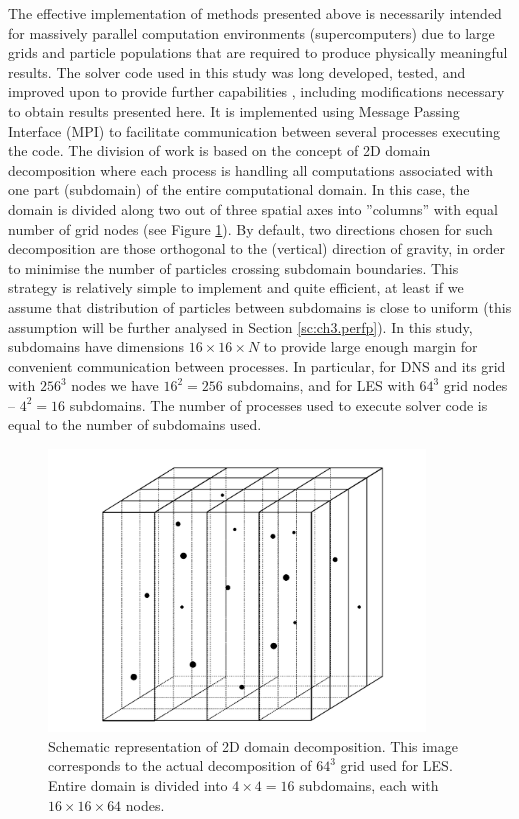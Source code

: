 \documentclass{pracamgren}
\begin{document}
The effective implementation of methods presented above is necessarily intended for massively parallel computation environments (supercomputers) due to large grids and particle populations that are required to produce physically meaningful results.
The solver code used in this study was long developed, tested, and improved upon to provide further capabilities \parencite[see~e.g.][]{Ayala2014,Parishani2015}, including modifications necessary to obtain results presented here.
It is implemented using Message Passing Interface (MPI) to facilitate communication between several processes executing the code.
The division of work is based on the concept of 2D domain decomposition where each process is handling all computations associated with one part (subdomain) of the entire computational domain.
In this case, the domain is divided along two out of three spatial axes into ''columns'' with equal number of grid nodes (see Figure \ref{fig:2dd}).
By default, two directions chosen for such decomposition are those orthogonal to the (vertical) direction of gravity, in order to minimise the number of particles crossing subdomain boundaries. 
This strategy is relatively simple to implement and quite efficient, at least if we assume that distribution of particles between subdomains is close to uniform (this assumption will be further analysed in Section \ref{sc:ch3.perfp}).
In this study, subdomains have dimensions $16 \times 16 \times N$ to provide large enough margin for convenient communication between processes.
In particular, for DNS and its grid with $256^{3}$ nodes we have $16^{2} = 256$ subdomains, and for LES with $64^{3}$ grid nodes -- $4^{2} = 16$ subdomains.
The number of processes used to execute solver code is equal to the number of subdomains used.

\begin{figure}[h]
\centering
\includegraphics[width=10cm]{figures/1-04_2dd.pdf}
\caption{
Schematic representation of 2D domain decomposition.
This image corresponds to the actual decomposition of $64^{3}$ grid used for LES.
Entire domain is divided into $4 \times 4 = 16$ subdomains, each with $16 \times 16 \times 64$ nodes.
}
\label{fig:2dd}
\end{figure}
\end{document}
